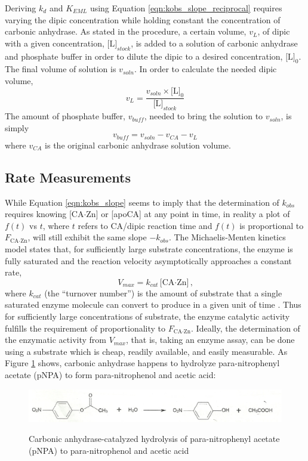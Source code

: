 Deriving $k_d$ and $K_{EML}$ using Equation \eqref{eqn:kobs_slope_reciprocal} requires varying the dipic concentration while holding constant the concentration of carbonic anhydrase. As stated in the procedure, a certain volume, $v_L$, of dipic with a given concentration, $\text{[L]}_{stock}$, is added to a solution of carbonic anhydrase and phosphate buffer in order to dilute the dipic to a desired concentration, $\text{[L]}_0$. The final volume of solution is $v_{soln}$. In order to calculate the needed dipic volume,
\begin{equation}\label{eqn:dipic_dilution}
v_L=\frac{v_{soln} \times \text{[L]}_0}{\text{[L]}_{stock}}
\end{equation}
The amount of phosphate buffer, $v_{buff}$, needed to bring the solution to $v_{soln}$, is simply
\begin{equation}\label{eqn:buff_volume}
v_{buff}=v_{soln}-v_{CA}-v_L
\end{equation}
where $v_{CA}$ is the original carbonic anhydrase solution volume.

\subsection{Rate Measurements}
While Equation \eqref{eqn:kobs_slope} seems to imply that the determination of $k_{obs}$ requires knowing [CA$\cdot$Zn] or [apoCA] at any point in time, in reality a plot of $f(t)$ vs $t$, where $t$ refers to CA/dipic reaction time and $f(t)$ is proportional to $F_\text{CA$\cdot$Zn}$, will still exhibit the same slope $-k_{obs}$. The Michaelis-Menten kinetics model states that, for sufficiently large substrate concentrations, the enzyme is fully saturated and the reaction velocity asymptotically approaches a constant rate,
\begin{equation}\label{eqn:vmax}
V_{max}=k_{cat}\text{[CA$\cdot$Zn]}\text{,} 
\end{equation}
where $k_{cat}$ (the ``turnover number'') is the amount of substrate that a single saturated enzyme molecule can convert to produce in a given unit of time \cite{bib:lehninger_mm}. Thus for sufficiently large concentrations of substrate, the enzyme catalytic activity fulfills the requirement of proportionality to $F_\text{CA$\cdot$Zn}$. Ideally, the determination of the enzymatic activity from $V_{max}$, that is, taking an enzyme assay, can be done using a substrate which is cheap, readily available, and easily measurable. As Figure \ref{fig:pnpa_reaction} shows, carbonic anhydrase happens to hydrolyze para-nitrophenyl acetate (pNPA) to form para-nitrophenol and acetic acid:
\begin{figure}[h]
  \includegraphics[width=.9\textwidth]{./Figures/pnpa_hydrolysis.jpg}\\
  \caption{Carbonic anhydrase-catalyzed hydrolysis of para-nitrophenyl acetate (pNPA) to para-nitrophenol and acetic acid \cite{bib:lab_manual}}\label{fig:pnpa_reaction}
\end{figure}

